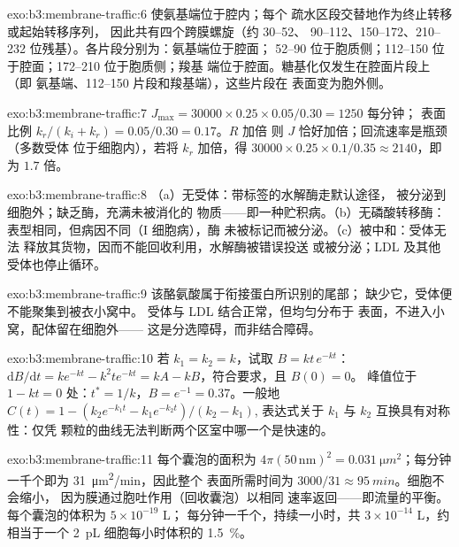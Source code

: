 \begin{solution}{exo:b3:membrane-traffic:6}
使氨基端位于腔内；每个
疏水区段交替地作为终止转移或起始转移序列，
因此共有四个跨膜螺旋（约 30--52、
90--112、150--172、210--232 位残基）。各片段分别为：氨基端位于腔面；
52--90 位于胞质侧；112--150 位于腔面；172--210 位于胞质侧；羧基
端位于腔面。糖基化仅发生在腔面片段上（即
氨基端、112--150 片段和羧基端），这些片段在
表面变为胞外侧。
\end{solution}

\begin{solution}{exo:b3:membrane-traffic:7}
$J_{\max} = \num{30000}\times 0.25\times 0.05/0.30 = 1250$ 每分钟；
表面比例 $k_{r}/(k_{i} + k_{r}) = 0.05/0.30 = 0.17$。$R$ 加倍
则 $J$ 恰好加倍；回流速率是瓶颈（多数受体
位于细胞内），若将 $k_{r}$ 加倍，得 $\num{30000}\times 0.25
\times 0.1/0.35 \approx 2140$，即为 $1.7$ 倍。
\end{solution}

\begin{solution}{exo:b3:membrane-traffic:8}
（a）无受体：带标签的水解酶走默认途径，
被分泌到细胞外；缺乏酶，充满未被消化的
物质——即一种贮积病。（b）无磷酸转移酶：
表型相同，但病因不同（I 细胞病），酶
未被标记而被分泌。（c）被中和：受体无法
释放其货物，因而不能回收利用，水解酶被错误投送
或被分泌；LDL 及其他受体也停止循环。
\end{solution}

\begin{solution}{exo:b3:membrane-traffic:9}
该酪氨酸属于衔接蛋白所识别的尾部；
缺少它，受体便不能聚集到被衣小窝中。
受体与 LDL 结合正常，但均匀分布于
表面，不进入小窝，配体留在细胞外——
这是分选障碍，而非结合障碍。
\end{solution}

\begin{solution}{exo:b3:membrane-traffic:10}
若 $k_{1} = k_{2} = k$，试取 $B = kt\,e^{-kt}$：$\mathrm{d}B/\mathrm{d}t
= k e^{-kt} - k^{2}t e^{-kt} = kA - kB$，符合要求，且 $B(0) = 0$。
峰值位于 $1 - kt = 0$ 处：$t^{*} = 1/k$，$B = e^{-1} = 0.37$。一般地
$C(t) = 1 - (k_{2}e^{-k_{1}t} - k_{1}e^{-k_{2}t})/(k_{2} - k_{1})$,
表达式关于 $k_{1}$ 与 $k_{2}$ 互换具有对称性：仅凭
颗粒的曲线无法判断两个区室中哪一个是快速的。
\end{solution}

\begin{solution}{exo:b3:membrane-traffic:11}
每个囊泡的面积为 $4\pi(50\,\text{nm})^{2} = \qty{0.031}{\micro
m^2}$；每分钟一千个即为 \qty{31}{\micro m^2/min}，因此整个
表面所需时间为 $3000/31 \approx \qty{95}{min}$。细胞不会缩小，
因为膜通过胞吐作用（回收囊泡）以相同
速率返回——即流量的平衡。每个囊泡的体积为 $5\times 10^{-19}$ L；
每分钟一千个，持续一小时，共 $3\times 10^{-14}$ L，约
相当于一个 \qty{2}{pL} 细胞每小时体积的 \qty{1.5}{\%}。
\end{solution}

